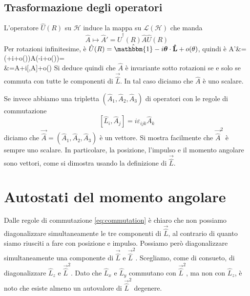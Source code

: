 \documentclass[a4paper, 11pt]{article}
\newcommand{\op}{\hat}
\newcommand{\Op}[1]{\vec{\hat{#1}}}
\def\bal#1\eal{\begin{align*}#1\end{align*}}
\renewcommand{\H}{\mathcal{H}}
\renewcommand{\L}{\mathcal{L}}
\newcommand{\1}{\mathbbm{1}}
\begin{document}
	\subsection{Trasformazione degli operatori}
	L'operatore $\op U(R)$ su $\H$ induce la mappa su $\L (\H)$ che manda
	\[\op A\mapsto \op A'=\op U^\dagger(R)\op A\op U(R)\]
	Per rotazioni infinitesime, è $\op U(R)=\op\1-i\bm\theta\cdot\Op L+o(\theta)$, quindi è
	\bal 
	\op A'&=(\op\1+i\bm\theta\cdot\Op{L}+o(\theta))\op A(\op\1-i\bm\theta\cdot\Op{L}+o(\theta))=\\&=\op A+i[\bm\theta\cdot\Op{L},\op A]+o(\theta)
	\eal
	Si deduce quindi che $\op A$ è invariante sotto rotazioni se e solo se commuta con tutte le componenti di $\Op L$. In tal caso diciamo che $\op A$ è uno scalare.
	
	Se invece abbiamo una tripletta $(\op A_1,\op A_2,\op A_3)$ di operatori con le regole di commutazione
	\[[\op L_i,\op A_j]=i\varepsilon_{ijk}\op A_k\]
	diciamo che $\Op A=(\op A_1,\op A_2,\op A_3)$ è un vettore. Si mostra facilmente che $\Op A^2$ è sempre uno scalare. In particolare, la posizione, l'impulso e il momento angolare sono vettori, come si dimostra usando la definizione di $\Op L$.
	\section{Autostati del momento angolare}
	Dalle regole di commutazione \ref{eq:commutation} è chiaro che non possiamo diagonalizzare simultaneamente le tre componenti di $\Op L$, al contrario di quanto siamo riusciti a fare con posizione e impulso. Possiamo però diagonalizzare simultaneamente una componente di $\Op L$ e $\Op L^2$. Scegliamo, come di consueto, di diagonalizzare $\op L_z$ e $\Op L^2$. Dato che $\op L_x$ e $\op L_y$ commutano con $\Op L^2$, ma non con $\op L_z$, è noto che esiste almeno un autovalore di $\Op{L}^2$ degenere. 
\end{document}
